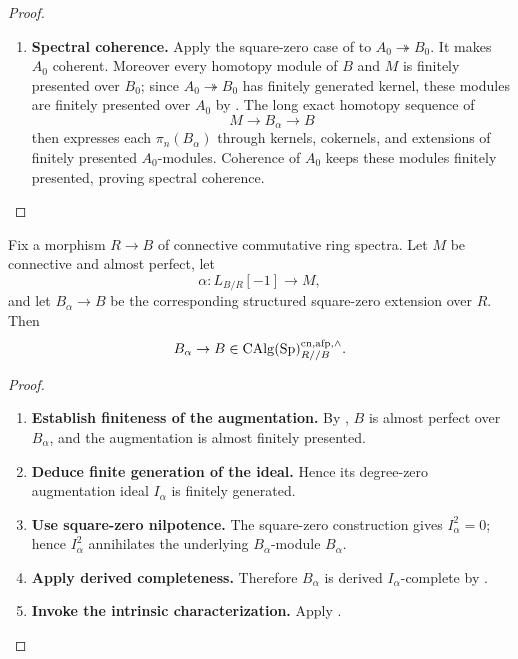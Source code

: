 \begin{proof}
\begin{enumerate}[label=\textup{(\arabic*)}]
    The degree-zero kernel of a square-zero extension is square-zero, so
    \(I_\alpha^2=0\) and
    \[
        B_0\simeq A_0/I_\alpha.
    \]
    A finite \(B_0\)-generating set of \(I_\alpha\) is also a finite
    \(A_0\)-generating set. Applying
     to
    \(A_0\twoheadrightarrow B_0\) now makes \(I_\alpha\) finitely presented
    over \(A_0\).
    \item \textbf{Spectral coherence.}
    Apply the square-zero case of
     to
    \(A_0\twoheadrightarrow B_0\). It makes \(A_0\) coherent. Moreover every
    homotopy module of \(B\) and \(M\) is finitely presented over \(B_0\);
    since \(A_0\twoheadrightarrow B_0\) has finitely generated kernel, these
    modules are finitely presented over \(A_0\) by
    . The long exact homotopy
    sequence of
    \[
        M\longrightarrow B_\alpha\longrightarrow B
    \]
    then expresses each \(\pi_n(B_\alpha)\) through kernels, cokernels, and
    extensions of finitely presented \(A_0\)-modules. Coherence of \(A_0\)
    keeps these modules finitely presented, proving spectral coherence.
\end{enumerate}
\end{proof}

\begin{corollary}
\label{cor:square-zero-complete-aft}
Fix a morphism \(R\to B\) of connective commutative ring spectra. Let \(M\) be connective and almost
perfect, let
\[
    \alpha:L_{B/R}[-1]\longrightarrow M,
\]
and let \(B_\alpha\to B\) be the corresponding structured square-zero
extension over \(R\). Then
\[
    B_\alpha\to B
    \in
    \operatorname{CAlg}(\operatorname{Sp})^{\mathrm{cn},\mathrm{afp},\wedge}_{R//B}.
\]
\end{corollary}

\begin{proof}
\leavevmode
\begin{enumerate}[label=\textup{(\arabic*)}]
    \item \textbf{Establish finiteness of the augmentation.}
    By , \(B\) is almost perfect over
    \(B_\alpha\), and the augmentation is almost finitely presented.
    \item \textbf{Deduce finite generation of the ideal.}
    Hence its
    degree-zero augmentation ideal \(I_\alpha\) is finitely generated.
    \item \textbf{Use square-zero nilpotence.}
    The
    square-zero construction gives \(I_\alpha^2=0\); hence \(I_\alpha^2\)
    annihilates the underlying \(B_\alpha\)-module \(B_\alpha\).
    \item \textbf{Apply derived completeness.}
    Therefore
    \(B_\alpha\) is derived \(I_\alpha\)-complete by
    .
    \item \textbf{Invoke the intrinsic characterization.}
    Apply
    .
\end{enumerate}
\end{proof}


